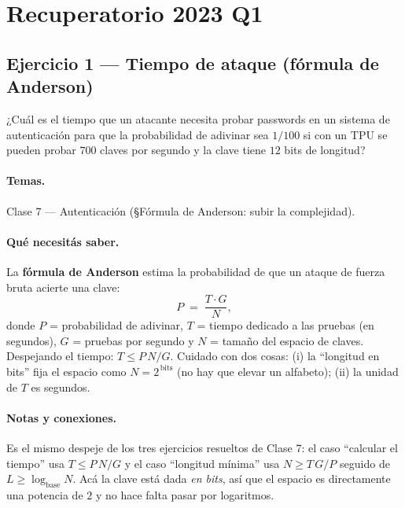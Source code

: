 \section{Recuperatorio 2023 Q1}

\subsection{Ejercicio 1 — Tiempo de ataque (fórmula de Anderson)}

\begin{consigna}
¿Cuál es el tiempo que un atacante necesita probar passwords en un sistema de autenticación
para que la probabilidad de adivinar sea $1/100$ si con un TPU se pueden probar $700$ claves por
segundo y la clave tiene $12$ bits de longitud?
\end{consigna}

\paragraph{Temas.} Clase 7 — Autenticación (\S Fórmula de Anderson: subir la complejidad).

\paragraph{Qué necesitás saber.}
La \textbf{fórmula de Anderson} estima la probabilidad de que un ataque de fuerza bruta acierte
una clave:
\begin{equation}
  P \;=\; \frac{T\cdot G}{N},
\end{equation}
donde $P$ = probabilidad de adivinar, $T$ = tiempo dedicado a las pruebas (en segundos),
$G$ = pruebas por segundo y $N$ = tamaño del espacio de claves. Despejando el tiempo:
$T \le P\,N/G$. Cuidado con dos cosas: (i) la ``longitud en bits'' fija el espacio como
$N = 2^{\,\text{bits}}$ (no hay que elevar un alfabeto); (ii) la unidad de $T$ es segundos.

\paragraph{Notas y conexiones.}
Es el mismo despeje de los tres ejercicios resueltos de Clase 7: el caso ``calcular
el tiempo'' usa $T \le P\,N/G$ y el caso ``longitud mínima'' usa $N \ge T\,G/P$ seguido de
$L \ge \log_{\text{base}} N$. Acá la clave está dada \emph{en bits}, así que el espacio es
directamente una potencia de $2$ y no hace falta pasar por logaritmos.

